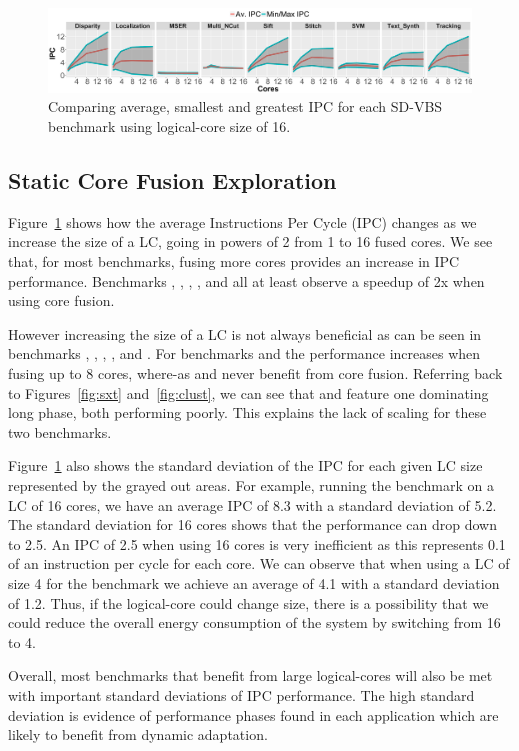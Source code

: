 \begin{figure}[t]
    \centering
    \includegraphics[width=1\textwidth]{graphics/Exploration/stddev.pdf}
        \vspace*{-7mm}
    \caption{Comparing average, smallest and greatest IPC for each SD-VBS benchmark using logical-core size of 16.}
    \label{fig:stddev}
\vspace{5mm}
\end{figure}
\subsection{Static Core Fusion Exploration}

Figure~\ref{fig:stddev} shows how the average Instructions Per Cycle (IPC) changes as we increase the size of a LC, going in powers of 2 from 1 to 16 fused cores.
We see that, for most benchmarks, fusing more cores provides an increase in IPC performance.
Benchmarks , , , ,  and  all at least observe a speedup of 2x when using core fusion.

However increasing the size of a LC is not always beneficial as can be seen in benchmarks , , , , and .
For benchmarks  and  the performance increases when fusing up to 8 cores, where-as  and  never benefit from core fusion. 
Referring back to Figures~\ref{fig:sxt} and~\ref{fig:clust}, we can see that  and  feature one dominating long phase, both performing poorly.
This explains the lack of scaling for these two benchmarks.

Figure~\ref{fig:stddev} also shows the standard deviation of the IPC for each given LC size represented by the grayed out areas.
For example, running the  benchmark on a LC of 16 cores, we have an average IPC of 8.3 with a standard deviation of 5.2.
The standard deviation for 16 cores shows that the performance can drop down to 2.5.
An IPC of 2.5 when using 16 cores is very inefficient as this represents 0.1 of an instruction per cycle for each core.
We can observe that when using a LC of size 4 for the  benchmark we achieve an average of 4.1 with a standard deviation of 1.2.
Thus, if the logical-core could change size, there is a possibility that we could reduce the overall energy consumption of the system by switching from 16 to 4.

Overall, most benchmarks that benefit from large logical-cores will also be met with important standard deviations of IPC performance.
The high standard deviation is evidence of performance phases found in each application which are likely to benefit from dynamic adaptation.

